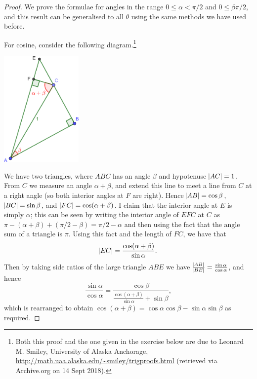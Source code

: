 \documentclass[a4paper,leqno]{article}
\numberwithin{equation}{section}
\theoremstyle{definition}
\theoremstyle{remark}
\begin{document}
\begin{proof}
  We prove the formulae for angles in the range $ 0 \leq \alpha < \pi/2 $ and $ 0 \leq \beta \pi/2 $, and this
  result can be generalised to all $ \theta $ using the same methods we have used before.

  For cosine, consider the following diagram.\footnote{Both this proof and the one given in the exercise below are due to Leonard M. Smiley, University of Alaska Anchorage, \url{http://math.uaa.alaska.edu/~smiley/trigproofs.html} (retrieved via Archive.org on 14 Sept 2018).}
  \begin{center}
    \includegraphics[width=0.3\textwidth]{cosinesum}
  \end{center}
  We have two triangles, where $ ABC $ has an angle $ \beta $ and hypotenuse $ \abs{AC} = 1 $. From $ C $ we measure an angle $ \alpha + \beta $,
  and extend this line to meet a line from $ C $ at a right angle (so both interior angles at $ F $ are right). Hence $ \abs{AB} = \cos\beta $,
  $ \abs{BC} = \sin \beta $, and $ \abs{FC} = \cos(\alpha + \beta) $. I claim that the interior angle at $ E $ is simply $ \alpha $; this
  can be seen by writing the interior angle of $ EFC $ at $ C $ as $ \pi - (\alpha + \beta) + (\pi/2 - \beta) = \pi/2 - \alpha $ and then
  using the fact that the angle sum of a triangle is $ \pi $. Using this fact and the length of $ FC $, we have that
  \begin{displaymath}
    \abs{EC} = \frac{\cos (\alpha + \beta)}{\sin \alpha}.
  \end{displaymath}
  Then by taking side ratios of the large triangle $ ABE $ we have $ \frac{\abs{AB}}{\abs{BE}} = \frac{\sin \alpha}{\cos \alpha} $, and hence
  \begin{displaymath}
    \frac{\sin \alpha}{\cos \alpha} = \frac{\cos \beta}{\frac{\cos (\alpha + \beta)}{\sin \alpha} + \sin \beta},
  \end{displaymath}
  which is rearranged to obtain $ \cos(\alpha + \beta) = \cos \alpha \cos \beta - \sin \alpha \sin \beta $ as required.
\end{proof}
\end{document}
